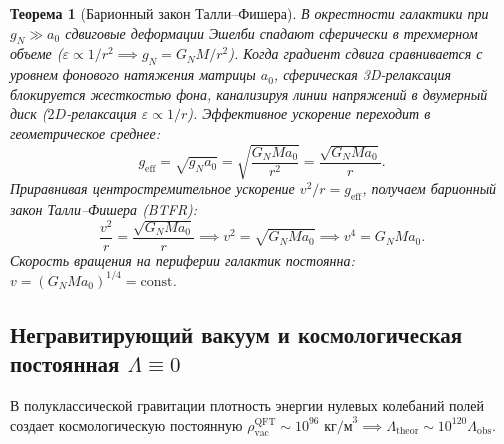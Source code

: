\documentclass[11pt,a4paper]{article}
\newtheorem{theorem}{Теорема}
\theoremstyle{definition}
\theoremstyle{remark}
\begin{document}
\begin{theorem}[Барионный закон Талли--Фишера]
\label{thm:tully_fisher_derivation}
В окрестности галактики при $g_N \gg a_0$ сдвиговые деформации Эшелби спадают сферически в трехмерном объеме ($\varepsilon \propto 1/r^2 \implies g_N = G_N M / r^2$). Когда градиент сдвига сравнивается с уровнем фонового натяжения матрицы $a_0$, сферическая 3D-релаксация блокируется жесткостью фона, канализируя линии напряжений в двумерный диск ($2D$-релаксация $\varepsilon \propto 1/r$). Эффективное ускорение переходит в геометрическое среднее:
\begin{equation}
	g_{\mathrm{eff}} = \sqrt{g_N a_0} = \sqrt{\frac{G_N M a_0}{r^2}} = \frac{\sqrt{G_N M a_0}}{r}.
\end{equation}
Приравнивая центростремительное ускорение $v^2 / r = g_{\mathrm{eff}}$, получаем барионный закон Талли--Фишера (BTFR):
\begin{equation}
	\frac{v^2}{r} = \frac{\sqrt{G_N M a_0}}{r} \implies v^2 = \sqrt{G_N M a_0} \implies v^4 = G_N M a_0.
	\label{eq:btfr_exact}
\end{equation}
Скорость вращения на периферии галактик постоянна: $v = (G_N M a_0)^{1/4} = \text{const}$.
\end{theorem}

\subsection{Негравитирующий вакуум и космологическая постоянная $\Lambda \equiv 0$}

В полуклассической гравитации плотность энергии нулевых колебаний полей создает космологическую постоянную $\rho_{\mathrm{vac}}^{\mathrm{QFT}} \sim 10^{96}\text{ кг/м}^3 \implies \Lambda_{\mathrm{theor}} \sim 10^{120} \Lambda_{\mathrm{obs}}$.
\end{document}
